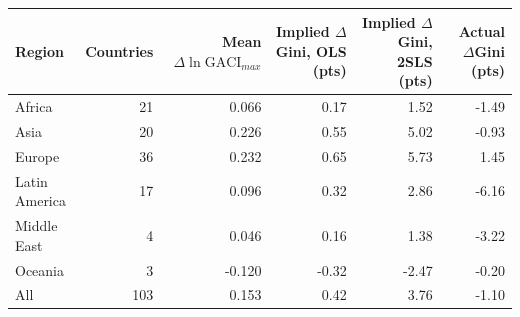 \begin{tabular}{lrrrrr}
\toprule
Region & Countries & Mean $\Delta\ln\mathrm{GACI}_{max}$ & Implied $\Delta$Gini, OLS (pts) & Implied $\Delta$Gini, 2SLS (pts) & Actual $\Delta$Gini (pts) \\
\midrule
Africa & 21 & 0.066 & 0.17 & 1.52 & -1.49 \\
Asia & 20 & 0.226 & 0.55 & 5.02 & -0.93 \\
Europe & 36 & 0.232 & 0.65 & 5.73 & 1.45 \\
Latin America & 17 & 0.096 & 0.32 & 2.86 & -6.16 \\
Middle East & 4 & 0.046 & 0.16 & 1.38 & -3.22 \\
Oceania & 3 & -0.120 & -0.32 & -2.47 & -0.20 \\
\midrule All & 103 & 0.153 & 0.42 & 3.76 & -1.10 \\
\bottomrule
\end{tabular}